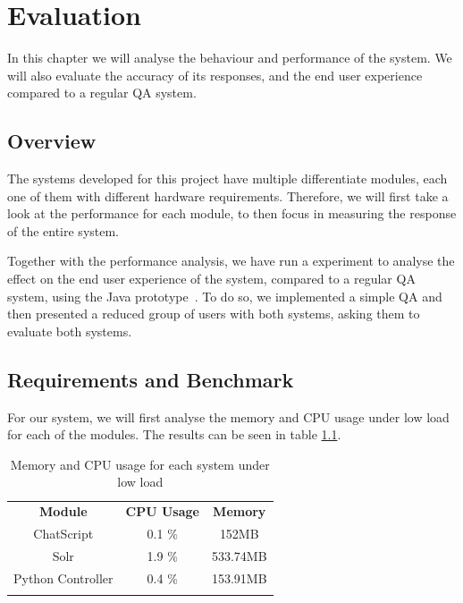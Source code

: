 \chapter{Evaluation}
\label{chap:evaluation}

\begin{chapterintro}

In this chapter we will analyse the behaviour and performance of the system. We will also evaluate the accuracy of its responses, and the end user experience compared to a regular \ac{QA} system.
 
\end{chapterintro}

\cleardoublepage

\section{Overview}

The systems developed for this project have multiple differentiate modules, each one of them with different hardware requirements. Therefore, we will first take a look at the performance for each module, to then focus in measuring the response of the entire system.

Together with the performance analysis, we have run a experiment to analyse the effect on the end user experience of the system, compared to a regular \ac{QA} system, using the Java prototype~\cite{Coro1509Personal}. To do so, we implemented a simple \ac{QA} and then presented a reduced group of users with both systems, asking them to evaluate both systems.

\section{Requirements and Benchmark}

For our system, we will first analyse the memory and CPU usage under low load for each of the modules. The results can be seen in table \ref{tab:loadmeasures}.

\begin{table}
  \centering
  \begin{tabular*}{0.7\textwidth}{| c | c | c |}
    \hhline{|-|-|-|}
    \textbf{Module} & \textbf{CPU Usage} & \textbf{Memory} \\ \hhline{|=|=|=|}
    ChatScript & 0.1 \% &  152MB \\ \hhline{|-|-|-|}
    Solr & 1.9 \% & 533.74MB \\ \hhline{|-|-|-|}
    Python Controller & 0.4 \% & 153.91MB \\ \hhline{|-|-|-|} 
    \end{tabular*}
  \caption{Memory and CPU usage for each system under low load}
  \label{tab:loadmeasures}
\end{table}

